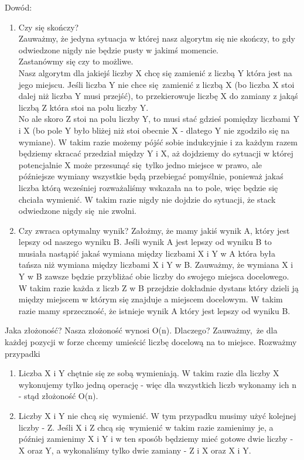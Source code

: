 \documentclass[12pt]{article}
\begin{document}
Dowód:
\begin{enumerate}
    \item Czy się skończy?\\
    Zauważmy, że jedyna sytuacja w której nasz algorytm się nie skończy, to gdy odwiedzone nigdy nie będzie pusty w jakimś momencie.\\

    Zastanówmy się czy to możliwe.\\

    Nasz algorytm dla jakiejś liczby X chcę się zamienić z liczbą Y która jest na jego miejscu. Jeśli liczba Y nie chce się zamienić z liczbą X (bo liczba X stoi dalej niż liczba Y musi przejść), to przekierowuje liczbę X do zamiany z jakąś liczbą Z która stoi na polu liczby Y.\\

    No ale skoro Z stoi na polu liczby Y, to musi stać gdzieś pomiędzy liczbami Y i X (bo pole Y było bliżej niż stoi obecnie X - dlatego Y nie zgodziło się na wymiane). W takim razie możemy pójść sobie indukcyjnie i za każdym razem będziemy skracać przedział między Y i X, aż dojdziemy do sytuacji w której potencjalnie X może przesunąć się tylko jedno miejsce w prawo, ale późniejsze wymiany wszystkie będą przebiegać pomyślnie, ponieważ jakaś liczba którą wcześniej rozważaliśmy wskazała na to pole, więc będzie się chciała wymienić. W takim razie nigdy nie dojdzie do sytuacji, że stack odwiedzone nigdy się nie zwolni.\\
    \item Czy zwraca optymalny wynik?
    Założmy, że mamy jakiś wynik A, który jest lepszy od naszego wyniku B.
    Jeśli wynik A jest lepszy od wyniku B to musiała nastąpić jakaś wymiana między liczbami X i Y w A która była tańsza niż wymiana między liczbami X i Y w B. 
    Zauważmy, że wymiana X i Y w B zawsze będzie przybliżać obie liczby do swojego miejsca docelowego. W takim razie każda z liczb Z w B przejdzie dokładnie dystans który dzieli ją między miejscem w którym się znajduje a miejscem docelowym.
    W takim razie mamy sprzeczność, że istnieje wynik A który jest lepszy od wyniku B.  
\end{enumerate}


Jaka złożoność?
Nasza złożoność wynosi O(n). Dlaczego?
Zauważmy, że dla każdej pozycji w forze chcemy umieścić liczbę docelową na to miejsce. 
Rozważmy przypadki
\begin{enumerate}
    \item Liczba X i Y chętnie się ze sobą wymieniają.
    W takim razie dla liczby X wykonujemy tylko jedną operację - więc dla wszystkich liczb wykonamy ich n - stąd złożoność O(n).
    \item Liczby X i Y nie chcą się wymienić.
    W tym przypadku musimy użyć kolejnej liczby - Z. Jeśli X i Z chcą się wymienić w takim razie zamienimy je, a później zamienimy X i Y i w ten sposób będziemy mieć gotowe dwie liczby - X oraz Y, a wykonaliśmy tylko dwie zamiany - Z i X oraz X i Y.\\
\end{enumerate}
\end{document}
